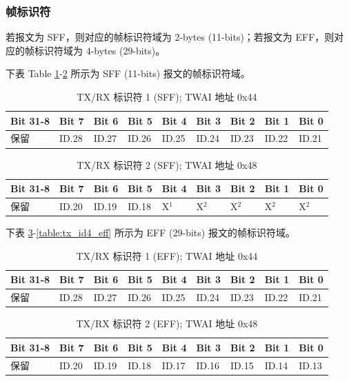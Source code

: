 \documentclass[main\_\_CN.tex]{subfiles}
\begin{document}
\subsubsection{帧标识符}
若报文为 SFF，则对应的帧标识符域为 2-bytes (11-bits)；若报文为 EFF，则对应的帧标识符域为 4-bytes (29-bits)。

下表 Table \ref{table:tx_id1_sff}-\ref{table:tx_id2_sff} 所示为 SFF (11-bits) 报文的帧标识符域。

\begin{longtable}[c]{|p{1.4cm}|p{1.4cm}|p{1.4cm}|p{1.4cm}|p{1.4cm}|p{1.4cm}|p{1.4cm}|p{1.4cm}|p{1.4cm}|}
    \caption{TX/RX 标识符 1 (SFF); TWAI 地址 0x44}
    \label{table:tx_id1_sff}\\
    \hline
       \rowcolor{lightgray}
    Bit 31-8 & Bit 7 & Bit 6 & Bit 5 & Bit 4 & Bit 3 & Bit 2 & Bit 1 & Bit 0\\
    \hline
    保留 & ID.28 & ID.27 & ID.26 & ID.25 & ID.24 & ID.23 & ID.22 & ID.21\\
    \hline
\end{longtable}

\begin{longtable}[c]{|p{1.4cm}|p{1.4cm}|p{1.4cm}|p{1.4cm}|p{1.4cm}|p{1.4cm}|p{1.4cm}|p{1.4cm}|p{1.4cm}|}
    \caption{TX/RX 标识符 2 (SFF); TWAI 地址 0x48}
    \label{table:tx_id2_sff}\\
    \hline
       \rowcolor{lightgray}
    Bit 31-8 & Bit 7 & Bit 6 & Bit 5 & Bit 4 & Bit 3 & Bit 2 & Bit 1 & Bit 0\\
    \hline
    保留 & ID.20 & ID.19 & ID.18 & X$^1$ & X$^2$ & X$^2$ & X$^2$ & X$^2$\\
    \hline
\end{longtable}

下表 \ref{table:tx_id1_eff}-\ref{table:tx_id4_eff} 所示为 EFF (29-bits) 报文的帧标识符域。

\begin{longtable}[c]{|p{1.4cm}|p{1.4cm}|p{1.4cm}|p{1.4cm}|p{1.4cm}|p{1.4cm}|p{1.4cm}|p{1.4cm}|p{1.4cm}|}
    \caption{TX/RX 标识符 1 (EFF); TWAI 地址 0x44}
    \label{table:tx_id1_eff}\\
    \hline
       \rowcolor{lightgray}
    Bit 31-8 & Bit 7 & Bit 6 & Bit 5 & Bit 4 & Bit 3 & Bit 2 & Bit 1 & Bit 0\\
    \hline
    保留 & ID.28 & ID.27 & ID.26 & ID.25 & ID.24 & ID.23 & ID.22 & ID.21\\
    \hline
\end{longtable}

\begin{longtable}[c]{|p{1.4cm}|p{1.4cm}|p{1.4cm}|p{1.4cm}|p{1.4cm}|p{1.4cm}|p{1.4cm}|p{1.4cm}|p{1.4cm}|}
    \caption{TX/RX 标识符 2 (EFF); TWAI 地址 0x48}
    \label{table:tx_id2_eff}\\
    \hline
       \rowcolor{lightgray}
    Bit 31-8 & Bit 7 & Bit 6 & Bit 5 & Bit 4 & Bit 3 & Bit 2 & Bit 1 & Bit 0\\
    \hline
    保留 & ID.20 & ID.19 & ID.18 & ID.17 & ID.16 & ID.15 & ID.14 & ID.13\\
    \hline
\end{longtable}
\end{document}
